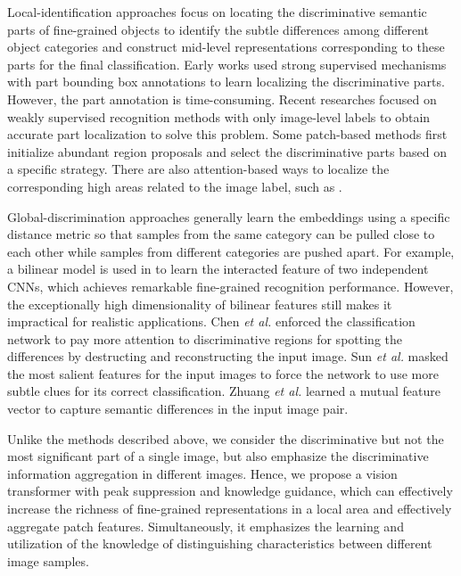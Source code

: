 \documentclass[5p,twocolumn]{elsarticle}
\begin{document}
Local-identification approaches focus on locating the discriminative semantic parts of fine-grained objects to identify the subtle differences among different object categories and construct mid-level representations corresponding to these parts for the final classification.
Early works \cite{Huang2016Part,Donahue2014DeCAF} used strong supervised mechanisms with part bounding box annotations to learn localizing the discriminative parts. However, the part annotation is time-consuming.
Recent researches \cite{Min2019Survey,Ge2019Weakly,Jiang2020Multi, Wang2021} focused on weakly supervised recognition methods with only image-level labels to obtain accurate part localization to solve this problem. 
Some patch-based methods \cite{Yang2018Learning, Liu2021Plant, Liu2020Filtration} first initialize abundant region proposals and select the discriminative parts based on a specific strategy. 
There are also attention-based ways to localize the corresponding high areas related to the image label, such as  \cite{Peng2018Object,Zheng2020Learning, Wang2020Weakly, Min2019Ingredient}.  

Global-discrimination approaches generally learn the embeddings using a specific distance metric so that samples from the same category can be pulled close to each other while samples from different categories are pushed apart.
For example, a bilinear model is used in \cite{Lin2018Bilinear} to learn the interacted feature of two independent CNNs, which achieves remarkable fine-grained recognition performance. However, the exceptionally high dimensionality of bilinear features still makes it impractical for realistic applications.
Chen \textit{et al.} \cite{Chen2019Destruction} enforced the classification network to pay more attention to discriminative regions for spotting the differences by destructing and reconstructing the input image.
Sun \textit{et al.} \cite{Sun2020Fine} masked the most salient features for the input images to force the network to use more subtle clues for its correct classification.
Zhuang \textit{et al.}\cite{Zhuang2020Learning} learned a mutual feature vector to capture semantic differences in the input image pair.


Unlike the methods described above, we consider the discriminative but not the most significant part of a single image, but also emphasize the discriminative information aggregation in different images. Hence, we propose a vision transformer with peak suppression and knowledge guidance, which can effectively increase the richness of fine-grained representations in a local area and effectively aggregate patch features.
Simultaneously, it emphasizes the learning and utilization of the knowledge of distinguishing characteristics between different image samples.
\end{document}
